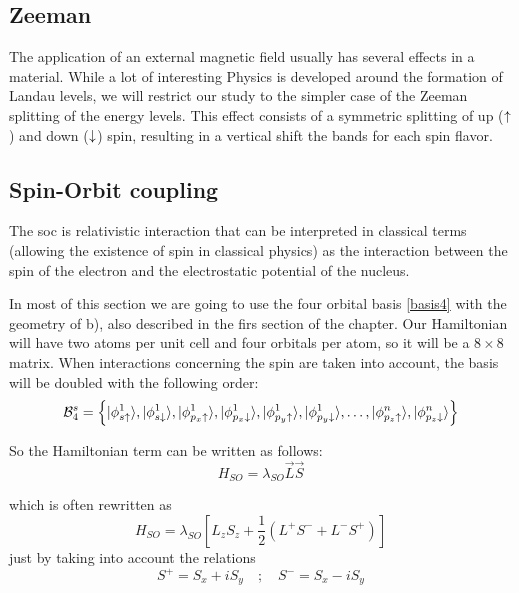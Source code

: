 \subsection{Zeeman}
The application of an external magnetic field usually has several effects in a material. While a lot of interesting Physics is developed around the formation of Landau levels, we will restrict our study to the simpler case of the Zeeman splitting of the energy levels. This effect consists of a symmetric splitting of up ($\uparrow$) and down ($\downarrow$) spin, resulting in a vertical shift the bands for each spin flavor.

\subsection{Spin-Orbit coupling}
\label{sec:soc}
The \acf{soc} is relativistic interaction that can be interpreted in classical terms (allowing the existence of spin in classical physics) as the interaction between the spin of the electron and the electrostatic potential of the nucleus.

In most of this section we are going to use the four orbital basis \eqref{basis4} with the geometry of b), also described in the firs section of the chapter. Our Hamiltonian will have two atoms per unit cell and four orbitals per atom, so it will be a $8\times8$ matrix. When interactions concerning the spin are taken into account, the basis will be doubled with the following order:
\begin{equation}
  \mathcal{B}^{s}_4 = \left\{
  |\phi^1_{s\uparrow}\rangle,
  |\phi^1_{s\downarrow}\rangle,
  |\phi^1_{p_x\uparrow}\rangle,
  |\phi^1_{p_x\downarrow}\rangle,
  |\phi^1_{p_y\uparrow}\rangle,
  |\phi^1_{p_y\downarrow}\rangle,
  \dots,
  |\phi^n_{p_z\uparrow}\rangle,
  |\phi^n_{p_z\downarrow}\rangle
  \right\}
\label{basis4spin}
\end{equation}

So the Hamiltonian term can be written as follows:
\begin{equation}
   H_{SO}= \lambda_{SO}\vec{L}\vec{S}
\label{soc}
\end{equation}

which is often rewritten as
\begin{equation}
   H_{SO} = \lambda_{SO}\left[L_zS_z+
   \frac{1}{2}\left(L^{+}S^{-}+L^{-}S^{+}\right)\right]
\end{equation}
just by taking into account the relations
\begin{equation*}
   S^{+} = S_x + iS_y \quad;\quad
   S^{-} = S_x - iS_y
\end{equation*}

